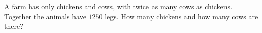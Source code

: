 A farm has only chickens and cows, with twice as many cows as chickens. Together the animals have $1250$ legs. How many chickens and how many cows are there?
